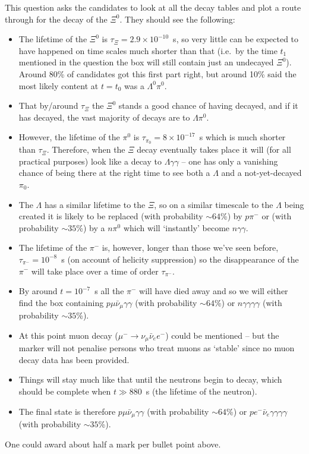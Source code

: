 \documentclass[txfonts]{NSTexam}
\begin{document}
\begin{questions}
\begin{allparts}
{This question asks the candidates to look at all the decay tables and plot a route through for the decay of the $\Xi^0$.  They should see the following:
\begin{itemize}
\item
The lifetime of the $\Xi^0$ is $\tau_\Xi=2.9\times 10^{-10}$~s, so very little can be expected to have happened on time scales much shorter than that (i.e.~by the time $t_1$ mentioned in the question the box will still contain just an undecayed $\Xi^0$).  Around 80\% of candidates got this first part right, but around 10\% said the most likely content at $t=t_0$ was a $\Lambda^0 \pi^0$.
\item
That by/around  $\tau_\Xi$ the $\Xi^0$ stands a good chance of having decayed, and if it has decayed, the vast majority of decays are to $\Lambda \pi^0$.
\item
However, the lifetime of the $\pi^0$ is $\tau_{\pi_0}=8\times 10^{-17}$~s which is much shorter than $\tau_\Xi$. Therefore, when the $\Xi$ decay eventually takes place it will (for all practical purposes) look like a decay to $\Lambda \gamma \gamma$ -- one has only a vanishing chance of being there at the right time to see both a $\Lambda$ and a not-yet-decayed $\pi_0$.
\item
The $\Lambda$ has a similar lifetime to the $\Xi$, so on a similar timescale to the $\Lambda$ being created it is likely to be replaced (with probability $\sim64$\%) by $p\pi^-$ or (with probability $\sim35$\%) by a $n\pi^0$ which will `instantly' become $n\gamma\gamma$.
\item
The lifetime of the $\pi^-$ is, however, longer than those we've seen before, $\tau_{\pi^-}=10^{-8}$~s (on account of helicity suppression) so the disappearance of the $\pi^-$ will take place over a time of order $\tau_{\pi^-}$.
\item By around $t=10^{-7}$~s all the $\pi^-$ will have died away and so we will either find the box containing $p\mu\bar\nu_\mu\gamma\gamma$ (with probability $\sim64$\%) or $n\gamma\gamma\gamma\gamma$ (with probability $\sim35$\%).
\item
At this point muon decay ($\mu^-\rightarrow \nu_\mu \bar\nu_e e^-$) could  be mentioned -- but the marker will not penalise persons who treat  muons as `stable' since no muon decay data has been provided.
\item
Things will stay much like that until the neutrons begin to decay, which should be complete when $t\gg 880$~s (the lifetime of the neutron).
\item
The final state is therefore $p\mu\bar\nu_\mu\gamma\gamma$ (with probability $\sim64$\%) or $p e^-\bar\nu_e\gamma\gamma\gamma\gamma$ (with probability $\sim35$\%).
\end{itemize}
One could award about half a mark per bullet point above.

}
\end{allparts}
\end{questions}
\end{document}

